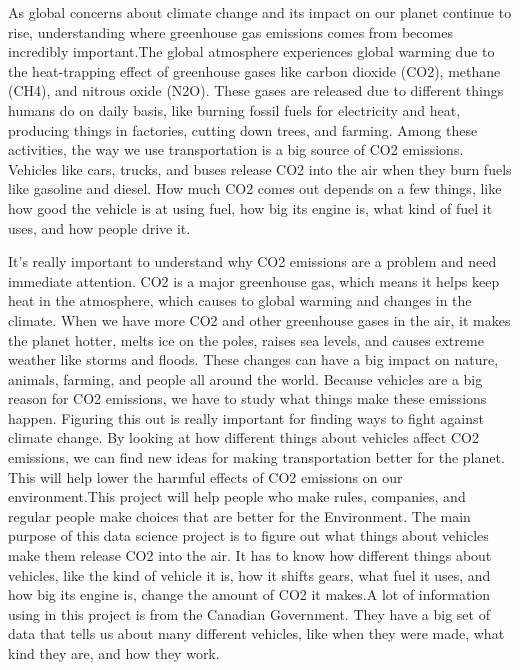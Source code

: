 \documentclass[12pt, a4paper,oneside]{book}
\numberwithin{equation}{section}
\begin{document}
As global concerns about climate change and its impact on our planet continue to rise, understanding where greenhouse gas emissions comes from becomes incredibly important.The global atmosphere experiences global warming due to the heat-trapping effect of greenhouse gases like carbon dioxide (CO2), methane (CH4), and nitrous oxide (N2O). These gases are released due to different things humans do on daily basis, like burning fossil fuels for electricity and heat, producing things in factories, cutting down trees, and farming. Among these activities, the way we use transportation is a big source of CO2 emissions. Vehicles like cars, trucks, and buses release CO2 into the air when they burn fuels like gasoline and diesel. How much CO2 comes out depends on a few things, like how good the vehicle is at using fuel, how big its engine is, what kind of fuel it uses, and how people drive it.~\cite{ref9}

It's really important to understand why CO2 emissions are a problem and need immediate attention. CO2 is a major greenhouse gas, which means it helps keep heat in the atmosphere, which causes to global warming and changes in the climate. When we have more CO2 and other greenhouse gases in the air, it makes the planet hotter, melts ice on the poles, raises sea levels, and causes extreme weather like storms and floods. These changes can have a big impact on nature, animals, farming, and people all around the world. Because vehicles are a big reason for CO2 emissions, we have to study what things make these emissions happen. Figuring this out is really important for finding ways to fight against climate change. By looking at how different things about vehicles affect CO2 emissions, we can find new ideas for making transportation better for the planet. This will help lower the harmful effects of CO2 emissions on our environment.This project will help people who make rules, companies, and regular people make choices that are better for the Environment.
The main purpose of this data science project is to figure out what things about vehicles make them release CO2 into the air. It has to know how different things about vehicles, like the kind of vehicle it is, how it shifts gears, what fuel it uses, and how big its engine is, change the amount of CO2 it makes.A lot of information using in this project is from the Canadian Government. They have a big set of data that tells us about many different vehicles, like when they were made, what kind they are, and how they work. 
\end{document}
